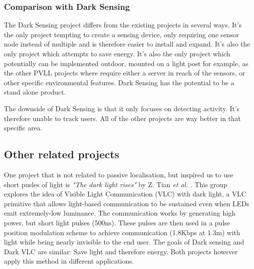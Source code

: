 \subsubsection{Comparison with Dark Sensing}
The Dark Sensing project differs from the existing projects in several ways. It's the only project tempting to create a sensing device, only requiring one sensor node instead of multiple and is therefore easier to install and expand. It's also the only project which attempts to save energy. It's also the only project which potentially can be implemented outdoor, mounted on a light post for example, as the other PVLL projects where require either a server in reach of the sensors, or other specific environmental features. Dark Sensing has the potential to be a stand alone product.

The downside of Dark Sensing is that it only focuses on detecting activity. It's therefore unable to track users. All of the other projects are way better in that specific area.

\subsection{Other related projects}
One project that is not related to passive localisation, but inspired us to use short pusles of light is \textit{"The dark light rises"} by Z. Tian \textit{et al.} \cite{Dark_Light_Rises} \cite{Dark_VLC}. This group explores the idea of Visible Light Communication (VLC) with dark light, a VLC primitive that allows light-based communication to be sustained even when LEDs emit extremely-low luminance. The communication works by generating high power, but short light pulses (500ns). These pulses are then used in a pulse position modulation scheme to achieve communication (1.8Kbps at 1.3m) with light while being nearly invisible to the end user. The goals of Dark sensing and Dark VLC are similar: Save light and therefore energy. Both projects however apply this method in different applications.